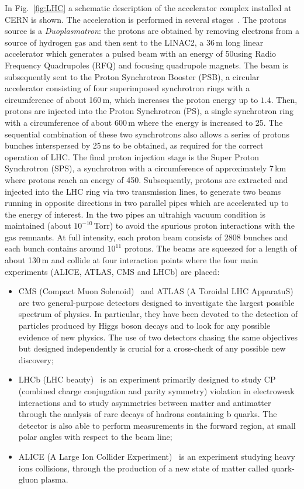 In Fig.~\ref{fig:LHC} a schematic description of the accelerator complex installed at CERN is shown.
The acceleration is performed in several stages~\cite{Benedikt:823808}. The protons source is a \emph{Duoplasmatron}: the protons are obtained by removing electrons from a source of hydrogen gas and then sent to the LINAC2, a 36\,m long linear accelerator which generates a pulsed beam with an energy of 50\MeV using Radio Frequency Quadrupoles (RFQ) and focusing quadrupole magnets. The beam is subsequently sent to the Proton Synchrotron Booster (PSB), a circular accelerator consisting of four superimposed synchrotron rings with a circumference of about 160\,m, which increases the proton energy up to $1.4$\GeV. Then, protons are injected into the Proton Synchrotron (PS), a single synchrotron ring with a circumference of about 600\,m where the energy is increased to 25\GeV. The sequential combination of these two synchrotrons also allows a series of protons bunches interspersed by 25\,ns to be obtained, as required for the correct operation of LHC. 
The final proton injection stage is the Super Proton Synchrotron (SPS), a synchrotron with a circumference of approximately 7\,km where protons reach an energy of 450\GeV. Subsequently, protons are extracted and injected into the LHC ring via two transmission lines, to generate two beams running in opposite directions in two parallel pipes which are accelerated up to the energy of interest. In the two pipes an ultrahigh vacuum condition is maintained (about $10^{-10}$\,Torr) to avoid the spurious proton interactions with the gas remnants. At full intensity, each proton beam consists of 2808 bunches and each bunch contains around $10^{11}$ protons. The beams are squeezed for a length of about 130\,m and collide at four interaction points where the four main experiments (ALICE, ATLAS, CMS and LHCb) are placed:
\begin{itemize}
\item CMS (Compact Muon Solenoid)~\cite{Chatrchyan:2008aa} and ATLAS (A Toroidal LHC ApparatuS)~\cite{Aad:2008zzm} are two general-purpose detectors designed to investigate the largest possible spectrum of physics. In particular, they have been devoted to the detection of particles produced by Higgs boson decays and to look for any possible evidence of new physics. The use of two detectors chasing the same objectives but designed independently is crucial for a cross-check of any possible new discovery;
\item LHCb (LHC beauty)~\cite{Alves:2008zz} is an experiment primarily designed to study CP (combined charge conjugation and parity symmetry) violation in electroweak interactions and to study asymmetries between matter and antimatter through the analysis of rare decays of hadrons containing b quarks. The detector is also able to perform measurements in the forward region, at small polar angles with respect to the beam line;
\item ALICE (A Large Ion Collider Experiment)~\cite{Aamodt:2008zz} is an experiment studying heavy ions collisions, through the production of a new state of matter called quark-gluon plasma.
\end{itemize}

